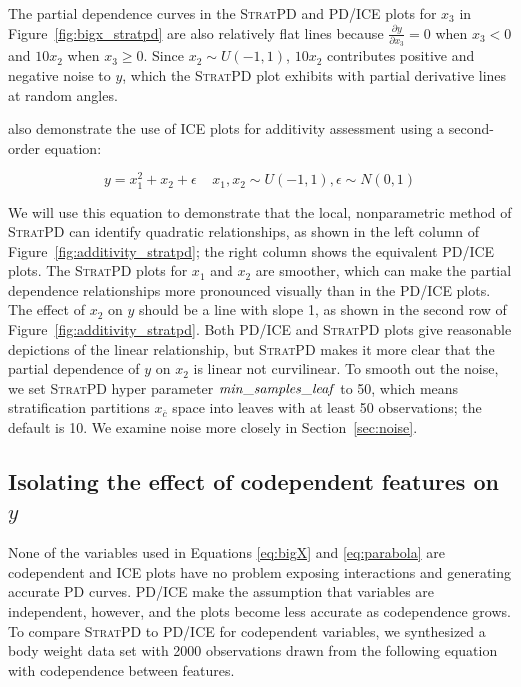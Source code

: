 \documentclass[12pt]{article}
\newcommand{\secref}[1]{Section~\ref{#1}}
\newcommand{\figref}[1]{Figure~\ref{#1}}
\newcommand{\spd}{\fontfamily{cmr}\textsc{\small StratPD}}
\newcommand{\xnc}{$x_{\overline{c}}$}
\begin{document}
The partial dependence curves in the \spd{} and PD/ICE plots for $x_3$ in \figref{fig:bigx_stratpd} are also relatively flat lines because $\frac{\partial y}{\partial x_3}=0$ when $x_3 < 0$ and $10 x_2$ when $x_3 \ge 0$. Since $x_2 \sim U(-1,1)$, $10 x_2$ contributes positive and negative noise to $y$, which the \spd{} plot exhibits with partial derivative lines at random angles.

\cite{ICE} also demonstrate the use of ICE plots for additivity assessment using a second-order equation:

\begin{equation}\label{eq:parabola}
y = x_1^2 + x_2 + \epsilon~~~~~x_1, x_2 \sim U(-1,1), \epsilon \sim N(0,1)
\end{equation}

\noindent We will use this equation to demonstrate that the local, nonparametric method of \spd{} can identify quadratic relationships, as shown in the left column of \figref{fig:additivity_stratpd}; the right column shows the equivalent PD/ICE plots. The \spd{} plots for $x_1$ and $x_2$ are smoother, which can make the partial dependence relationships more pronounced visually than in the PD/ICE plots.  The effect of $x_2$ on $y$ should be a line with slope 1, as shown in the second row of \figref{fig:additivity_stratpd}. Both PD/ICE and \spd{} plots give reasonable depictions of the linear relationship, but \spd{} makes it more clear that the partial dependence of $y$ on $x_2$ is linear not curvilinear. To smooth out the noise, we set \spd{} hyper parameter ${\it min\_samples\_leaf}$ to 50, which means stratification partitions \xnc{} space into leaves with at least 50 observations; the default is 10. We examine noise more closely in \secref{sec:noise}.

\subsection{Isolating the effect of codependent features on $y$}\label{sec:codep}

None of the variables used in Equations \eqref{eq:bigX} and \eqref{eq:parabola} are codependent and ICE plots have no problem exposing interactions and generating accurate PD curves.  PD/ICE make the assumption that variables are independent, however, and the plots become less accurate as codependence grows.  To compare \spd{} to PD/ICE for codependent variables, we synthesized a body weight data set with 2000 observations drawn from the following equation with codependence between features.
\end{document}
